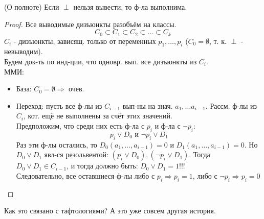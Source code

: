 \begin{theorem}(О полноте)
Если $\perp$ нельзя вывести, то ф-ла выполнима.
\end{theorem}
\begin{proof}
Все выводимые дизъюнкты разобъём на классы.
\[
C_0 \subset C_1 \subset C_2 \subset \ldots \subset C_k
\]
$C_i$ - дизъюнкты, зависящ. только от переменных $p_1, \ldots, p_i$ ($C_0 = \emptyset$, т. к. $\perp$ - невыводим). \\

Будем док-ть по инд-ции, что одновр. вып. все дизъюнкты из $C_i$. \\
ММИ:
\begin{itemize}
  \item База: $C_0 = \emptyset \Rightarrow $  очев.
  \item Переход: пусть все ф-лы из $C_{i - 1}$ вып-ны на знач. $a_1, \ldots a_{i - 1}$. Рассм. ф-лы из $C_i$, кот. ещё не выполнены за счёт этих значений. \\
    Предположим, что среди них есть ф-ла с $p_i$ и ф-ла с $\neg p_i$:
    \[
    p_i \lor D_0 \text{ и } \neg p_i \lor D_1
    \]
    Раз эти ф-лы остались, то $D_0(a_1, \ldots, a_{i - 1}) = 0$ и $D_1(a_1, \ldots, a_{i - 1}) = 0$. Но $D_0 \lor D_1$ явл-ся резольвентой: $(p_i \lor D_0), (\neg p_i \lor D_1)$. Тогда $D_0 \lor D_1 \in C_{i - 1}$, и тогда должно быть: $D_0 \lor D_1 = 1$!!! \\
    Следовательно, все оставшиеся ф-лы либо с $p_i \Rightarrow p_i = 1$, либо с $\neg p_{i} \Rightarrow p_i = 0$
\end{itemize}
\end{proof}
Как это связано с тафтологиями? А это уже совсем другая история.
